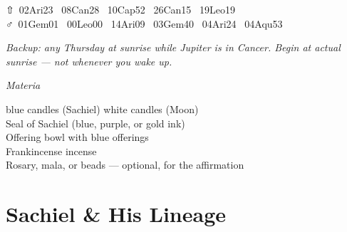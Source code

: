 \documentclass[10pt,openany]{book}
\newcommand{\rubricsize}{\large}
\newcommand{\rubric}[1]{%
  {\rubricsize\itshape\color{rubricsred} #1}%
}
\newcommand{\ps}[1]{{\liturgicalfont #1}}
\begin{document}
{\vspace{2pt}
{\footnotesize\color{darkgrey}\noindent%
\ps{⇧}~02Ari23 \enspace \ps{☉}~08Can28 \enspace \ps{☾}~10Cap52 \enspace \ps{☿}~26Can15 \enspace \ps{♀}~19Leo19\\[1pt]
\ps{♂}~01Gem01 \enspace \ps{♃}~00Leo00 \enspace \ps{♄}~14Ari09 \enspace \ps{♅}~03Gem40 \enspace \ps{♆}~04Ari24 \enspace \ps{♇}~04Aqu53%
}

\vspace{5pt}
\noindent\rubric{Backup: any Thursday at sunrise while Jupiter is in Cancer.
Begin at actual sunrise --- not whenever you wake up.}

\vspace{12pt}
{\color{rubricsred}\itshape Materia}

\vspace{4pt}
 blue candles (Sachiel)
 white candles (Moon)\\
Seal of Sachiel (blue, purple, or gold ink)\\
Offering bowl with blue offerings\\
Frankincense incense\\
Rosary, mala, or beads --- optional, for the affirmation

}

\mainmatter


\chapter*{Sachiel \& His Lineage}
\thispagestyle{fancy}
\end{document}
